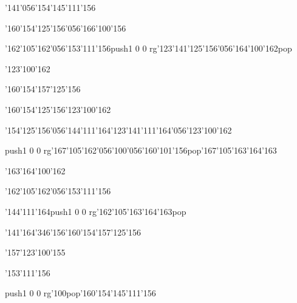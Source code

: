 \null\vfill\ipa\centerline{\enskip\enskip\enskip\enskip\enskip\enskip\enskip\char'141\char'056\char'154\char'145\char'111\char'156}\medskip\centerline{\enskip\char'160\char'154\char'125\char'156\char'056\char'166\char'100\char'156\enskip\enskip\enskip\enskip\enskip\enskip\enskip\enskip\enskip\enskip\enskip}\medskip\centerline{\enskip\enskip\enskip\char'162\char'105\char'162\char'056\char'153\char'111\char'156\enskip\pdfcolorstack\match push{1 0 0 rg}\char'123\char'141\char'125\char'156\char'056\char'164\char'100\char'162\pdfcolorstack\match pop{}}\medskip\centerline{\enskip\char'123\char'100\char'162\enskip\enskip\enskip\enskip\enskip\enskip\enskip\enskip\enskip\enskip\enskip}\medskip\centerline{\enskip\enskip\enskip\enskip\enskip\enskip\enskip\enskip\enskip\char'160\char'154\char'157\char'125\char'156}\medskip\vfill\footline{\hfil\tt\folio\hfil}\eject
\null\vfill\ipa\centerline{\enskip\enskip\enskip\enskip\enskip\enskip\enskip\enskip\enskip\enskip\enskip\enskip}\medskip\centerline{\enskip\char'160\char'154\char'125\char'156\enskip\enskip\enskip\enskip\enskip\enskip\enskip\enskip\enskip\enskip\enskip\enskip\char'123\char'100\char'162}\medskip\centerline{\enskip\enskip\enskip\char'154\char'125\char'156\char'056\char'144\char'111\char'164\enskip\char'123\char'141\char'111\char'164\char'056\char'123\char'100\char'162}\medskip\centerline{\enskip\pdfcolorstack\match push{1 0 0 rg}\char'167\char'105\char'162\char'056\char'100\char'056\char'160\char'101\char'156\pdfcolorstack\match pop{}\enskip\char'167\char'105\char'163\char'164\char'163}\medskip\centerline{\enskip\enskip\enskip\enskip\enskip\enskip\enskip\enskip\enskip\enskip\enskip\enskip\enskip\enskip}\medskip\vfill\footline{\hfil\tt\folio\hfil}\eject
\null\vfill\ipa\centerline{\enskip\enskip\enskip\enskip\enskip\enskip\enskip\enskip\enskip\enskip\enskip\enskip}\medskip\centerline{\enskip\char'163\char'164\char'100\char'162\enskip\enskip\enskip\enskip\enskip\enskip\enskip\enskip\enskip\enskip\enskip\enskip\enskip\enskip\enskip}\medskip\centerline{\enskip\enskip\enskip\char'162\char'105\char'162\char'056\char'153\char'111\char'156\enskip\enskip\enskip\enskip\enskip\enskip\enskip\enskip}\medskip\centerline{\enskip\char'144\char'111\char'164\enskip\enskip\enskip\enskip\enskip\enskip\pdfcolorstack\match push{1 0 0 rg}\char'162\char'105\char'163\char'164\char'163\pdfcolorstack\match pop{}}\medskip\centerline{\enskip\char'141\enskip\char'164\char'346\char'156\enskip\enskip\enskip\enskip\char'160\char'154\char'157\char'125\char'156}\medskip\vfill\footline{\hfil\tt\folio\hfil}\eject
\null\vfill\ipa\centerline{\enskip\enskip\enskip\enskip\enskip\enskip\enskip\enskip\enskip\enskip\enskip\enskip}\medskip\centerline{\enskip\enskip\enskip\enskip\enskip\enskip\enskip\enskip\enskip\enskip\enskip\enskip\enskip\enskip\enskip\enskip\enskip\enskip\enskip}\medskip\centerline{\enskip\char'157\enskip\enskip\enskip\enskip\char'123\char'100\char'155\enskip\enskip\enskip\enskip\enskip\enskip\enskip\enskip}\medskip\centerline{\enskip\char'153\char'111\char'156\enskip\enskip\enskip\enskip\enskip\enskip\enskip\enskip\enskip\enskip\enskip}\medskip\centerline{\enskip\pdfcolorstack\match push{1 0 0 rg}\char'100\pdfcolorstack\match pop{}\enskip\enskip\enskip\enskip\enskip\enskip\enskip\char'160\char'154\char'145\char'111\char'156}\medskip\vfill\footline{\hfil\tt\folio\hfil}\eject

